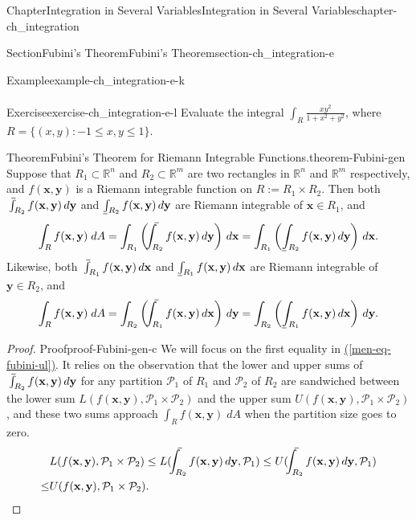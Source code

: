 \documentclass[oneside,10pt,]{book}
\makeatletter
\newcommand{\xreffont}{\relax}
\numberwithin{equation}{section}
\newcommand{\bx}{\mathbf{x}}
\newcommand{\by}{\mathbf{y}}
\newcommand{\bbR}{\mathbb{R}}
\newcommand{\cP}{\mathcal{P}}
\def\upint{\mathchoice
    {\mkern10mu\overline{\vphantom{\intop}\mkern7mu}\mkern-24mu}
    {\mkern7mu\overline{\vphantom{\intop}\mkern7mu}\mkern-14mu}
    {\mkern7mu\overline{\vphantom{\intop}\mkern7mu}\mkern-14mu}
    {\mkern7mu\overline{\vphantom{\intop}\mkern7mu}\mkern-14mu}
  \int}
\def\lowint{\relax\if@display
 \mkern3mu\underline{\vphantom{\intop}\mkern7mu}\mkern-10mu\int
\else 
\underline{\vphantom{\int}\mkern7mu}\mkern-10mu\int
\fi}
\newcommand{\amp}{&}
\makeatother
\begin{document}
\begin{chapterptx}{Chapter}{Integration in Several Variables}{}{Integration in Several Variables}{}{}{chapter-ch_integration}
\begin{sectionptx}{Section}{Fubini's Theorem}{}{Fubini's Theorem}{}{}{section-ch_integration-e}
\begin{example}{Example}{}{example-ch_integration-e-k}
\begin{align*}
\end{align*}
%
\end{example}
\begin{inlineexercise}{Exercise}{}{exercise-ch_integration-e-l}%
Evaluate the integral \(\int_{R}\frac{x y^{2}}{1+x^{2}+y^{2}}\), where \(R=\{(x, y): -1\le x, y \le 1\}\).%
\end{inlineexercise}%
\begin{theorem}{Theorem}{Fubini's Theorem for  Riemann Integrable Functions.}{}{theorem-Fubini-gen}%
Suppose that \(R_{1}\subset \bbR^{n}\) and \(R_{2}\subset \bbR^{m}\) are two rectangles in \(\bbR^{n}\) and \(\bbR^{m}\) respectively, and \(f(\bx, \by)\) is a Riemann integrable function on \(R:=R_{1}\times R_{2}\).  Then both \(\upint_{R_{2}} f(\bx, \by)\, d\by\)  and \(\lowint_{R_{2}} f(\bx, \by)\, d\by\) are Riemann integrable  of \(\bx \in R_{1}\), and%
\begin{equation}
\int_{R} f(\bx, \by)\; dA = \int_{R_{1}} \left( \upint_{R_{2}} f(\bx, \by)\, d\by \right)\, d\bx
= \int_{R_{1}} \left( \lowint_{R_{2}} f(\bx, \by)\, d\by \right)\, d\bx.\label{men-eq-fubini-ul}
\end{equation}
Likewise, both \(\upint_{R_{1}} f(\bx, \by)\, d\bx\)  and \(\lowint_{R_{1}} f(\bx, \by)\, d\bx\) are Riemann integrable  of \(\by \in R_{2}\), and%
\begin{equation*}
\int_{R} f(\bx, \by)\; dA = \int_{R_{2}} \left( \upint_{R_{1}} f(\bx, \by)\, d\bx \right)\, d\by
= \int_{R_{2}} \left( \lowint_{R_{1}} f(\bx, \by)\, d\bx \right)\, d\by.
\end{equation*}
\end{theorem}
\begin{proof}{Proof}{}{proof-Fubini-gen-c}
We will focus on the first equality in \hyperref[men-eq-fubini-ul]{({\xreffont\ref{men-eq-fubini-ul}})}. It relies on the observation that the lower and upper sums of \(\upint_{R_{2}} f(\bx, \by)\, d\by\) for any partition \(\cP_{1}\) of \(R_{1}\) and \(\cP_{2}\) of \(R_{2}\) are sandwiched between the lower sum \(L(f(\bx, \by), \cP_{1}\times \cP_{2})\) and the upper sum \(U(f(\bx, \by), \cP_{1}\times \cP_{2})\), and these two sums approach \(\int_{R} f(\bx, \by)\; dA\) when the partition size goes to zero.%
\begin{align*}
\amp L(f(\bx, \by), \cP_{1}\times \cP_{2})\le L(\upint_{R_{2}} f(\bx, \by)\, d\by, \cP_{1}) \le
U( \upint_{R_{2}} f(\bx, \by)\, d\by, \cP_{1}) \\
\le \amp U(f(\bx, \by), \cP_{1}\times \cP_{2}).
\end{align*}

\end{proof}
\end{sectionptx}
\end{chapterptx}
\end{document}
